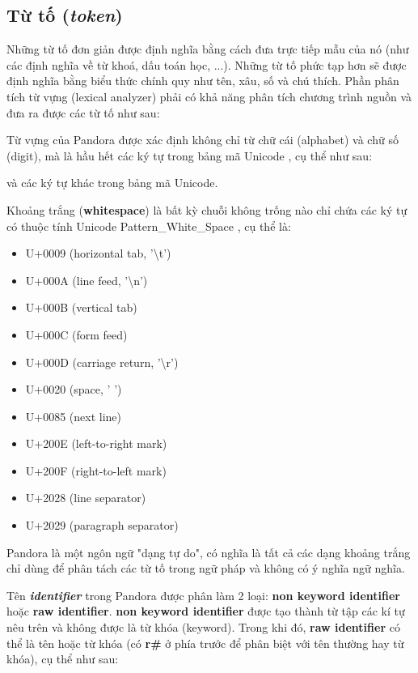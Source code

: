 \subsection{Từ tố (\textit{token})}
    Những từ tố đơn giản được định nghĩa bằng cách đưa trực tiếp mẫu của
nó (như các định nghĩa về từ khoá, dấu toán học, ...). Những từ tố phức tạp
hơn sẽ được định nghĩa bằng biểu thức chính quy như tên, xâu, số và chú thích.
Phần phân tích từ vựng (lexical analyzer) phải có khả năng phân tích chương trình nguồn
và đưa ra được các từ tố như sau:



    Từ vựng của Pandora được xác định không chỉ từ chữ cái (alphabet) và chữ số (digit), mà là hầu hết các ký tự trong bảng mã Unicode \cite{allen2012unicode}, cụ thể như sau:

    \regexdigit

    \regexalphabet

\noindent và các ký tự khác trong bảng mã Unicode.

    Khoảng trắng (\textbf{whitespace}) là bất kỳ chuỗi không trống nào chỉ chứa các ký tự có thuộc tính Unicode Pattern\_White\_Space \cite{web:unicode:report}, cụ thể là:
    \begin{itemize}
        \item{U+0009 (horizontal tab, '\textbackslash t')}
        \item{U+000A (line feed, '\textbackslash n')}
        \item{U+000B (vertical tab)}
        \item{U+000C (form feed)}
        \item{U+000D (carriage return, '\textbackslash r')}
        \item{U+0020 (space, ' ')}
        \item{U+0085 (next line)}
        \item{U+200E (left-to-right mark)}
        \item{U+200F (right-to-left mark)}
        \item{U+2028 (line separator)}
        \item{U+2029 (paragraph separator)}
    \end{itemize}
\noindent Pandora là một ngôn ngữ "dạng tự do", có nghĩa là tất cả các dạng khoảng trắng chỉ dùng để phân tách các từ tố trong ngữ pháp và không có ý nghĩa ngữ nghĩa.

    Tên \textbf{\textit{identifier}} trong Pandora được phân làm 2 loại: \textbf{non keyword identifier} hoặc \textbf{raw identifier}. \textbf{non keyword identifier} được tạo thành từ tập các kí tự nêu trên và không được là từ khóa (keyword). Trong khi đó, \textbf{raw identifier} có thể là tên hoặc từ khóa (có \textbf{r\#} ở phía trước để phân biệt với tên thường hay từ khóa), cụ thể như sau:

